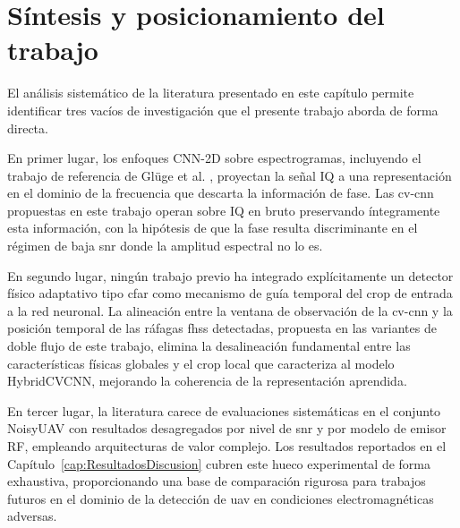 \section{Síntesis y posicionamiento del trabajo}
\label{sec:sintesis_estado_arte}

El análisis sistemático de la literatura presentado en este capítulo permite
identificar tres vacíos de investigación que el presente trabajo aborda de forma
directa.

En primer lugar, los enfoques CNN-2D sobre espectrogramas, incluyendo el trabajo
de referencia de Glüge et al. \cite{gluge_robust_2024}, proyectan la señal IQ a
una representación en el dominio de la frecuencia que descarta la información de
fase. Las \gls{cv-cnn} propuestas en este trabajo operan sobre IQ en bruto
preservando íntegramente esta información, con la hipótesis de que la fase resulta
discriminante en el régimen de baja \gls{snr} donde la amplitud espectral no lo es.

En segundo lugar, ningún trabajo previo ha integrado explícitamente un detector
físico adaptativo tipo \gls{cfar} como mecanismo de guía temporal del crop de entrada
a la red neuronal. La alineación entre la ventana de observación de la \gls{cv-cnn}
y la posición temporal de las ráfagas \gls{fhss} detectadas, propuesta en las
variantes de doble flujo de este trabajo, elimina la desalineación fundamental
entre las características físicas globales y el crop local que caracteriza al
modelo HybridCVCNN, mejorando la coherencia de la representación aprendida.

En tercer lugar, la literatura carece de evaluaciones sistemáticas en el conjunto
NoisyUAV con resultados desagregados por nivel de \gls{snr} y por modelo de emisor RF,
empleando arquitecturas de valor complejo. Los resultados reportados en el
Capítulo~\ref{cap:ResultadosDiscusion} cubren este hueco experimental de forma
exhaustiva, proporcionando una base de comparación rigurosa para trabajos futuros
en el dominio de la detección de \gls{uav} en condiciones electromagnéticas adversas.
